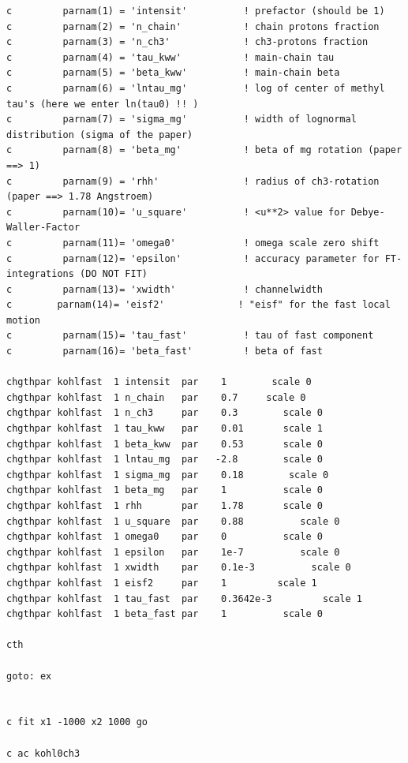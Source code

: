 \documentclass[11pt,fleqn]{book} %
\begin{document}
\begin{verbatim}
c         parnam(1) = 'intensit'          ! prefactor (should be 1)
c         parnam(2) = 'n_chain'           ! chain protons fraction
c         parnam(3) = 'n_ch3'             ! ch3-protons fraction
c         parnam(4) = 'tau_kww'           ! main-chain tau
c         parnam(5) = 'beta_kww'          ! main-chain beta
c         parnam(6) = 'lntau_mg'          ! log of center of methyl tau's (here we enter ln(tau0) !! )
c         parnam(7) = 'sigma_mg'          ! width of lognormal distribution (sigma of the paper)
c         parnam(8) = 'beta_mg'           ! beta of mg rotation (paper ==> 1)
c         parnam(9) = 'rhh'               ! radius of ch3-rotation (paper ==> 1.78 Angstroem)
c         parnam(10)= 'u_square'          ! <u**2> value for Debye-Waller-Factor
c         parnam(11)= 'omega0'            ! omega scale zero shift
c         parnam(12)= 'epsilon'           ! accuracy parameter for FT-integrations (DO NOT FIT)
c         parnam(13)= 'xwidth'            ! channelwidth
c        parnam(14)= 'eisf2'             ! "eisf" for the fast local motion
c         parnam(15)= 'tau_fast'          ! tau of fast component
c         parnam(16)= 'beta_fast'         ! beta of fast 

chgthpar kohlfast  1 intensit  par    1        scale 0      
chgthpar kohlfast  1 n_chain   par    0.7     scale 0
chgthpar kohlfast  1 n_ch3     par    0.3        scale 0
chgthpar kohlfast  1 tau_kww   par    0.01       scale 1 
chgthpar kohlfast  1 beta_kww  par    0.53 	     scale 0
chgthpar kohlfast  1 lntau_mg  par   -2.8	     scale 0
chgthpar kohlfast  1 sigma_mg  par    0.18        scale 0
chgthpar kohlfast  1 beta_mg   par    1 	     scale 0
chgthpar kohlfast  1 rhh       par    1.78 	     scale 0
chgthpar kohlfast  1 u_square  par    0.88          scale 0
chgthpar kohlfast  1 omega0    par    0          scale 0
chgthpar kohlfast  1 epsilon   par    1e-7          scale 0
chgthpar kohlfast  1 xwidth    par    0.1e-3          scale 0
chgthpar kohlfast  1 eisf2     par    1         scale 1
chgthpar kohlfast  1 tau_fast  par    0.3642e-3         scale 1
chgthpar kohlfast  1 beta_fast par    1          scale 0

cth

goto: ex


c fit x1 -1000 x2 1000 go

c ac kohl0ch3


\end{verbatim}
\end{document}
